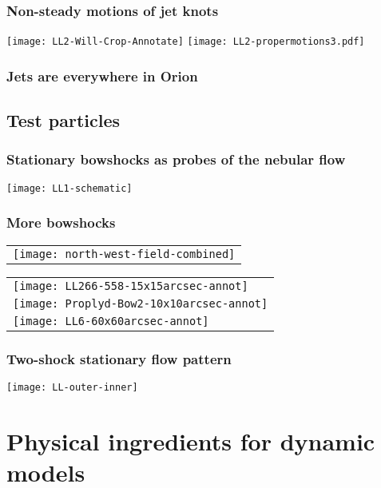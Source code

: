 \documentclass[presentation]{beamer}
\begin{document}
\begin{frame}
  \frametitle{Non-steady motions of jet knots}
  \hfill
  \texttt{[image: LL2-Will-Crop-Annotate]}
  \hfill
  \texttt{[image: LL2-propermotions3.pdf]}
  \hfill\null
\end{frame}

\begin{frame}
  \frametitle{Jets are everywhere in Orion}
\end{frame}


\subsection{Test particles}

\begin{frame}
  \frametitle{Stationary bowshocks as probes of the nebular flow}
  \texttt{[image: LL1-schematic]}
\end{frame}

\begin{frame}
  \frametitle{More bowshocks}
  \renewcommand\arraystretch{0}
  \setlength\tabcolsep{0pt}
  \begin{tabular}{l}
    \texttt{[image: north-west-field-combined]}\\
  \end{tabular}%
  \begin{tabular}{l}
    \texttt{[image: LL266-558-15x15arcsec-annot]}\\
    \texttt{[image: Proplyd-Bow2-10x10arcsec-annot]}\\
    \texttt{[image: LL6-60x60arcsec-annot]}\\
  \end{tabular}
\end{frame}

\begin{frame}
  \frametitle{Two-shock stationary flow pattern}
  \centering\texttt{[image: LL-outer-inner]}
\end{frame}

\section{Physical ingredients for dynamic models}
\end{document}
